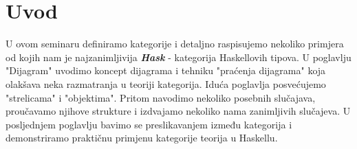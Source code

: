 \documentclass[11pt]{article}
\newcommand{\category}[1]{\textbf{\emph{#1}}}
\theoremstyle{definition}
\begin{document}
  \section{Uvod}
  U ovom seminaru definiramo kategorije i detaljno raspisujemo nekoliko
  primjera od kojih nam je najzanimljivija \category{Hask} - kategorija
  Haskellovih tipova.
  U poglavlju "Dijagram" uvodimo koncept dijagrama i tehniku "praćenja
  dijagrama" koja olakšava neka razmatranja u teoriji kategorija.
  Iduća poglavlja posvećujemo  "strelicama" i "objektima". Pritom navodimo nekoliko
  posebnih slučajava, proučavamo njihove strukture i izdvajamo nekoliko nama
  zanimljivih slučajeva.
  U posljednjem poglavlju bavimo se preslikavanjem između kategorija i
  demonstriramo praktičnu primjenu kategorije teorija u Haskellu.
  \newpage
\end{document}
